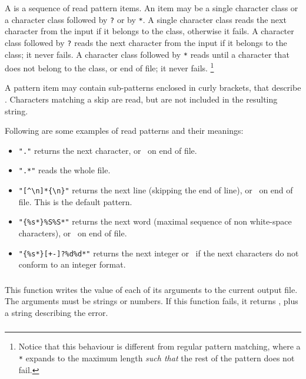 A  is a sequence of read pattern items.
An item may be a single character class
or a character class followed by \verb'?' or by \verb'*'.
A single character class reads the next character from the input
if it belongs to the class, otherwise it fails.
A character class followed by \verb'?' reads the next character
from the input if it belongs to the class;
it never fails.
A character class followed by \verb'*' reads until a character that
does not belong to the class, or end of file;
it never fails.%
\footnote{
Notice that this behaviour is different from regular pattern matching,
where a \verb'*' expands to the maximum length {\em such that}
the rest of the pattern does not fail.}

A pattern item may contain sub-patterns enclosed in curly brackets,
that describe .
Characters matching a skip are read,
but are not included in the resulting string.

Following are some examples of read patterns and their meanings:
\begin{itemize}
\item \verb|"."| returns the next character, or \nil\ on end of file.
\item \verb|".*"| reads the whole file.
\item \verb|"[^\n]*{\n}"| returns the next line
(skipping the end of line), or \nil\ on end of file.
This is the default pattern.
\item \verb|"{%s*}%S%S*"| returns the next word
(maximal sequence of non white-space characters),
or \nil\ on end of file.
\item \verb|"{%s*}[+-]?%d%d*"| returns the next integer
or \nil\ if the next characters do not conform to an integer format.
\end{itemize}

\subsubsection*{}

This function writes the value of each of its arguments to the
current output file.
The arguments must be strings or numbers.
If this function fails, it returns \nil,
plus a string describing the error.

\subsubsection*{}

